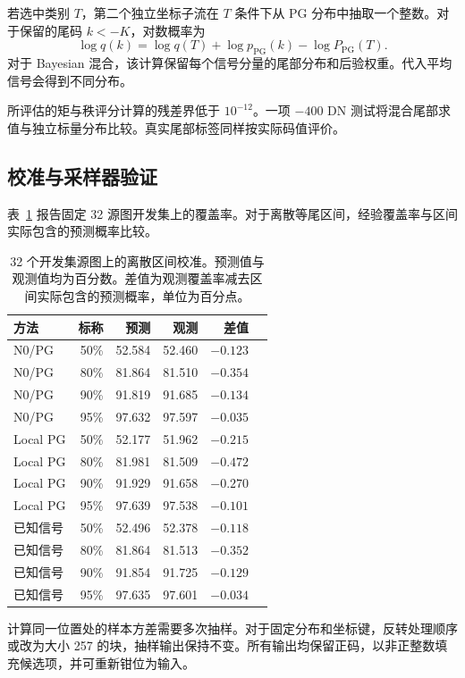 \documentclass[10pt,twocolumn,journal]{IEEEtran}
\begin{document}
若选中类别 $T$，第二个独立坐标子流在 $T$ 条件下从 PG 分布中抽取一个整数。对于保留的尾码 $k<-K$，对数概率为
\begin{equation}
\log q(k)=\log q(T)+\log p_{\mathrm{PG}}(k)-\log P_{\mathrm{PG}}(T).
\end{equation}
对于 Bayesian 混合，该计算保留每个信号分量的尾部分布和后验权重。代入平均信号会得到不同分布。

所评估的矩与秩评分计算的残差界低于 $10^{-12}$。一项 $-400$ DN 测试将混合尾部求值与独立标量分布比较。真实尾部标签同样按实际码值评价。

\subsection{校准与采样器验证}
表~\ref{tab:coverage} 报告固定 32 源图开发集上的覆盖率。对于离散等尾区间，经验覆盖率与区间实际包含的预测概率比较。

\begin{table}[t]
\centering\footnotesize
\caption{32 个开发集源图上的离散区间校准。预测值与观测值均为百分数。差值为观测覆盖率减去区间实际包含的预测概率，单位为百分点。}
\label{tab:coverage}
\setlength{\tabcolsep}{3pt}
\begin{tabular}{@{}lrrrrr@{}}
\toprule
方法 & 标称 & 预测 & 观测 & 差值\\
\midrule
N0/PG & 50\% & 52.584 & 52.460 & $-0.123$\\
N0/PG & 80\% & 81.864 & 81.510 & $-0.354$\\
N0/PG & 90\% & 91.819 & 91.685 & $-0.134$\\
N0/PG & 95\% & 97.632 & 97.597 & $-0.035$\\
Local PG & 50\% & 52.177 & 51.962 & $-0.215$\\
Local PG & 80\% & 81.981 & 81.509 & $-0.472$\\
Local PG & 90\% & 91.929 & 91.658 & $-0.270$\\
Local PG & 95\% & 97.639 & 97.538 & $-0.101$\\
已知信号 & 50\% & 52.496 & 52.378 & $-0.118$\\
已知信号 & 80\% & 81.864 & 81.513 & $-0.352$\\
已知信号 & 90\% & 91.854 & 91.725 & $-0.129$\\
已知信号 & 95\% & 97.635 & 97.601 & $-0.034$\\
\bottomrule
\end{tabular}
\end{table}

计算同一位置处的样本方差需要多次抽样。对于固定分布和坐标键，反转处理顺序或改为大小 257 的块，抽样输出保持不变。所有输出均保留正码，以非正整数填充候选项，并可重新钳位为输入。
\end{document}
